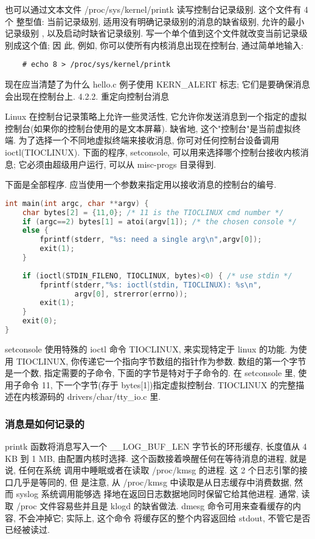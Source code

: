 \documentclass[a4paper,titlepage]{article}
\begin{document}
也可以通过文本文件 /proc/sys/kernel/printk 读写控制台记录级别. 这个文件有 4 个
整型值: 当前记录级别, 适用没有明确记录级别的消息的缺省级别, 允许的最小记录级别
, 以及启动时缺省记录级别. 写一个单个值到这个文件就改变当前记录级别成这个值; 因
此, 例如, 你可以使所有内核消息出现在控制台, 通过简单地输入:
\begin{lstlisting}
    # echo 8 > /proc/sys/kernel/printk
\end{lstlisting}
现在应当清楚了为什么 hello.c 例子使用 KERN_ALERT 标志; 它们是要确保消息会出现在控制台上.
4.2.2. 重定向控制台消息

Linux 在控制台记录策略上允许一些灵活性, 它允许你发送消息到一个指定的虚拟控制台(如果你的控制台使用的是文本屏幕). 缺省地, 这个"控制台"是当前虚拟终端. 为了选择一个不同地虚拟终端来接收消息, 你可对任何控制台设备调用 ioctl(TIOCLINUX). 下面的程序, setconsole, 可以用来选择哪个控制台接收内核消息; 它必须由超级用户运行, 可以从 misc-progs 目录得到.

下面是全部程序. 应当使用一个参数来指定用以接收消息的控制台的编号.

\begin{lstlisting}[language=c]
int main(int argc, char **argv) {
    char bytes[2] = {11,0}; /* 11 is the TIOCLINUX cmd number */
    if (argc==2) bytes[1] = atoi(argv[1]); /* the chosen console */
    else { 
        fprintf(stderr, "%s: need a single arg\n",argv[0]); 
        exit(1);
    }
    
    if (ioctl(STDIN_FILENO, TIOCLINUX, bytes)<0) { /* use stdin */
        fprintf(stderr,"%s: ioctl(stdin, TIOCLINUX): %s\n",
                argv[0], strerror(errno));
        exit(1);
    }
    exit(0);
}
\end{lstlisting}

setconsole 使用特殊的 ioctl 命令 TIOCLINUX, 来实现特定于 linux 的功能. 为使用
TIOCLINUX, 你传递它一个指向字节数组的指针作为参数. 数组的第一个字节是一个数,
指定需要的子命令, 下面的字节是特对于子命令的. 在 setconsole 里, 使用子命令 11,
下一个字节(存于 bytes[1])指定虚拟控制台. TIOCLINUX 的完整描述在内核源码的
drivers/char/tty_io.c 里.

\subsubsection{消息是如何记录的}

printk 函数将消息写入一个 __LOG_BUF_LEN 字节长的环形缓存, 长度值从 4 KB 到 1
MB, 由配置内核时选择. 这个函数接着唤醒任何在等待消息的进程, 就是说, 任何在系统
调用中睡眠或者在读取 /proc/kmsg 的进程. 这 2 个日志引擎的接口几乎是等同的, 但
是注意, 从 /proc/kmsg 中读取是从日志缓存中消费数据, 然而 syslog 系统调用能够选
择地在返回日志数据地同时保留它给其他进程. 通常, 读取 /proc 文件容易些并且是
klogd 的缺省做法. dmesg 命令可用来查看缓存的内容, 不会冲掉它; 实际上, 这个命令
将缓存区的整个内容返回给 stdout, 不管它是否已经被读过.
\end{document}
